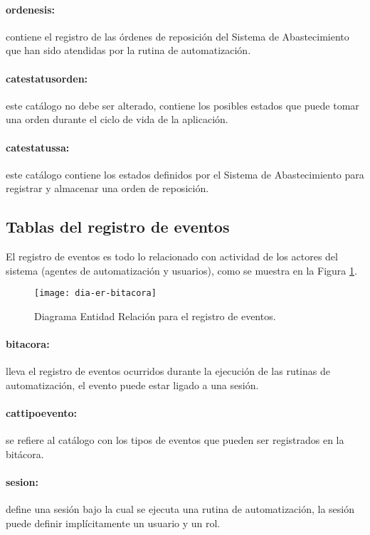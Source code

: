 \paragraph{ordenes{\textunderscore}is:} contiene el registro de las órdenes de reposición del Sistema de Abastecimiento que han sido atendidas por la rutina de automatización.
\paragraph{cat{\textunderscore}estatus{\textunderscore}orden:} este catálogo no debe ser alterado, contiene los posibles estados que puede tomar una orden durante el ciclo de vida de la aplicación.
\paragraph{cat{\textunderscore}estatus{\textunderscore}sa:} este catálogo contiene los estados definidos por el Sistema de Abastecimiento para registrar y almacenar una orden de reposición.


\subsection{Tablas del registro de eventos}
El registro de eventos es todo lo relacionado con actividad de los actores del sistema (agentes de automatización y usuarios), como se muestra en la Figura \ref{fig:dia-er-bitacora}.
\begin{figure}[h]
  \centering
  \texttt{[image: dia-er-bitacora]} 
  \caption{Diagrama Entidad Relación para el registro de eventos.}
  \label{fig:dia-er-bitacora}
\end{figure}
\paragraph{bitacora:} lleva el registro de eventos ocurridos durante la ejecución de las rutinas de automatización, el evento puede estar ligado a una sesión.
\paragraph{cat{\textunderscore}tipo{\textunderscore}evento:} se refiere al catálogo con los tipos de eventos que pueden ser registrados en la bitácora.
\paragraph{sesion:} define una sesión bajo la cual se ejecuta una rutina de automatización, la sesión puede definir implícitamente un usuario y un rol.


